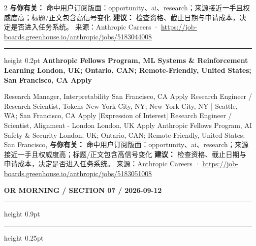 \documentclass[10.5pt]{ctexart}
\begin{document}
\begin{multicols}{2}
\textbf{与你有关：} 命中用户订阅版面：opportunity、ai、research；来源接近一手且权威度高；标题/正文包含高信号变化
\textbf{建议：} 检查资格、截止日期与申请成本，决定是否进入任务系统。
{\footnotesize\color{ormuted} 来源：Anthropic Careers · \url{https://job-boards.greenhouse.io/anthropic/jobs/5183044008}}
\vspace{2mm}
\hrule height 0.2pt
\vspace{2mm}
{\large\bfseries Anthropic Fellows Program, ML Systems \& Reinforcement Learning London, UK; Ontario, CAN; Remote-Friendly, United States; San Francisco, CA Apply}\par
[Expression of Interest] Research Manager, Interpretability San Francisco, CA Apply Research Engineer / Research Scientist, Tokens New York City, NY; New York City, NY | Seattle, WA; San Francisco, CA Apply [Expression of Interest] Research Engineer / Scientist, Alignment - London London, UK Apply Anthropic Fellows Program, AI Safety \& Security London, UK; Ontario, CAN; Remote-Friendly, United States; San Francisco, 
\textbf{与你有关：} 命中用户订阅版面：opportunity、ai、research；来源接近一手且权威度高；标题/正文包含高信号变化
\textbf{建议：} 检查资格、截止日期与申请成本，决定是否进入任务系统。
{\footnotesize\color{ormuted} 来源：Anthropic Careers · \url{https://job-boards.greenhouse.io/anthropic/jobs/5183051008}}
\end{multicols}
\newpage
{\small\bfseries OR MORNING / SECTION 07 / 2026-09-12}
\vspace{2mm}
\hrule height 0.9pt
\vspace{1.5mm}
\hrule height 0.25pt
\vspace{4mm}
\end{document}
